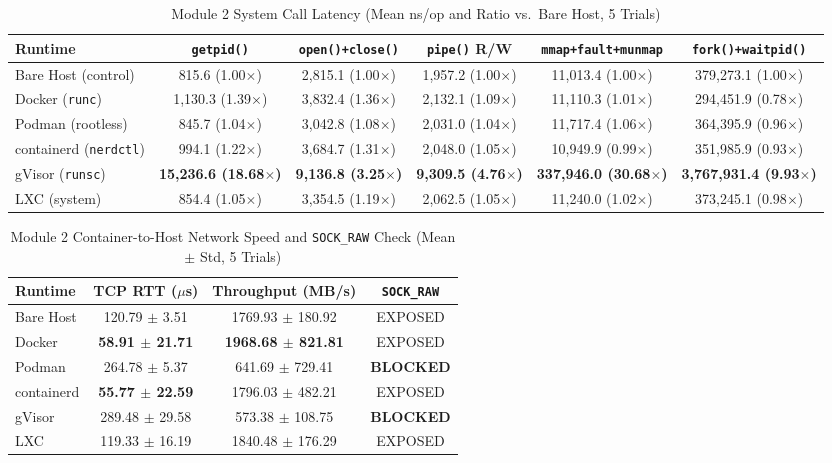 \documentclass[conference]{IEEEtran}
\begin{document}
\begin{table}[t]
\centering
\caption{Module 2 System Call Latency (Mean ns/op and Ratio vs.\ Bare Host, 5 Trials)}
\label{tab:m2_syscall}
\begin{tabular}{lccccc}
\toprule
\textbf{Runtime} & \textbf{\texttt{getpid()}} & \textbf{\texttt{open()+close()}} & \textbf{\texttt{pipe()} R/W} & \textbf{\texttt{mmap+fault+munmap}} & \textbf{\texttt{fork()+waitpid()}} \\
\midrule
Bare Host (control)           & 815.6 (1.00$\times$) & 2,815.1 (1.00$\times$) & 1,957.2 (1.00$\times$) & 11,013.4 (1.00$\times$) & 379,273.1 (1.00$\times$) \\
Docker (\texttt{runc})        & 1,130.3 (1.39$\times$) & 3,832.4 (1.36$\times$) & 2,132.1 (1.09$\times$) & 11,110.3 (1.01$\times$) & 294,451.9 (0.78$\times$) \\
Podman (rootless)             & 845.7 (1.04$\times$) & 3,042.8 (1.08$\times$) & 2,031.0 (1.04$\times$) & 11,717.4 (1.06$\times$) & 364,395.9 (0.96$\times$) \\
containerd (\texttt{nerdctl}) & 994.1 (1.22$\times$) & 3,684.7 (1.31$\times$) & 2,048.0 (1.05$\times$) & 10,949.9 (0.99$\times$) & 351,985.9 (0.93$\times$) \\
gVisor (\texttt{runsc})       & \textbf{15,236.6 (18.68$\times$)} & \textbf{9,136.8 (3.25$\times$)} & \textbf{9,309.5 (4.76$\times$)} & \textbf{337,946.0 (30.68$\times$)} & \textbf{3,767,931.4 (9.93$\times$)} \\
LXC (system)                  & 854.4 (1.05$\times$) & 3,354.5 (1.19$\times$) & 2,062.5 (1.05$\times$) & 11,240.0 (1.02$\times$) & 373,245.1 (0.98$\times$) \\
\bottomrule
\end{tabular}
\end{table}

\begin{table}[t]
\centering
\caption{Module 2 Container-to-Host Network Speed and \texttt{SOCK\_RAW} Check (Mean $\pm$ Std, 5 Trials)}
\label{tab:m2_net}
\begin{tabular}{lccc}
\toprule
\textbf{Runtime} & \textbf{TCP RTT ($\mu$s)} & \textbf{Throughput (MB/s)} & \textbf{\texttt{SOCK\_RAW}} \\
\midrule
Bare Host  & 120.79 $\pm$ 3.51  & 1769.93 $\pm$ 180.92 & EXPOSED \\
Docker     & \textbf{58.91 $\pm$ 21.71}  & \textbf{1968.68 $\pm$ 821.81} & EXPOSED \\
Podman     & 264.78 $\pm$ 5.37  & 641.69 $\pm$ 729.41  & \textbf{BLOCKED} \\
containerd & \textbf{55.77 $\pm$ 22.59}  & 1796.03 $\pm$ 482.21 & EXPOSED \\
gVisor     & 289.48 $\pm$ 29.58 & 573.38 $\pm$ 108.75  & \textbf{BLOCKED} \\
LXC        & 119.33 $\pm$ 16.19 & 1840.48 $\pm$ 176.29 & EXPOSED \\
\bottomrule
\end{tabular}
\end{table}
\end{document}
